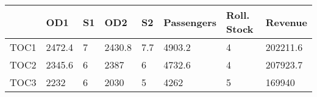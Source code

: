 \begin{tabular}{llllllll}
& OD1 & S1 & OD2 & S2 & Passengers & Roll. Stock & Revenue \\ 
\hline 
TOC1 & 2472.4 & 7 & 2430.8 & 7.7 & 4903.2 & 4 & 202211.6 \\ 
TOC2 & 2345.6 & 6 & 2387 & 6 & 4732.6 & 4 & 207923.7 \\ 
TOC3 & 2232 & 6 & 2030 & 5 & 4262 & 5 & 169940 \\ 
\hline 
\end{tabular}